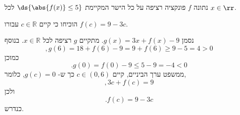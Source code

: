 נתונה
$f$
פונקציה רציפה על כל הישר המקיימת
$\ds{\abs{f(x)}\leq 5}$
לכל
$x\in\rr$.

הוכיחו כי קיים
$c\in\mathbb{R}$
עבורו
$f(c)=9-3c$.
\begin{solbox}
נסמן
$g(x)=3x+f(x)-9$.
מתקיים
$g$
רציפה לכל
$x\in\mathbb{R}$.
בנוסף
$$,g(6)=18+f(6)-9=9+f(6)\geq9-5=4>0$$
כמוכן
$$.g(0)=f(0)-9\leq 5-9=-4<0$$
ממשפט ערך הביניים, קיים
$c\in(0,6)$
כך ש-
$g(c)=0$,
כלומר,
$$,3c+f(c)=9$$
ולכן
$$.f(c)=9-3c$$
כנדרש.
\end{solbox}
